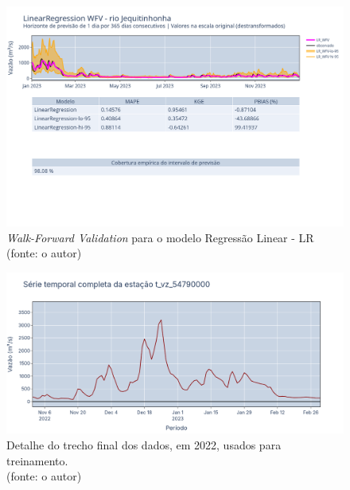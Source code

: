 \begin{figure}[!h]
	\centering
	\includegraphics[scale=0.33]{Figuras/jequiti/wfv/LR/LR_WFV_LOG.png}
	\caption{\textit{Walk-Forward Validation} para o modelo Regressão Linear - LR\\(fonte: o autor)}
	\label{fig:jequiti_LR_WFV_LOG}
\end{figure}

\begin{figure}[!h]
	\centering
	\includegraphics[scale=0.33]{Figuras/jequiti/LR_final_2022_detalhe.png}
	\caption{Detalhe do trecho final dos dados, em 2022, usados para treinamento.\\(fonte: o autor)}
	\label{fig:jequiti_LR_final_2022_detalhe}
\end{figure}


